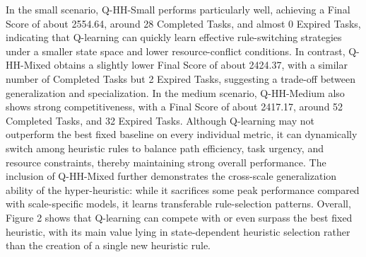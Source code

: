 In the small scenario, Q-HH-Small performs particularly well, achieving a Final Score of about 2554.64, around 28 Completed Tasks, and almost 0 Expired Tasks, indicating that Q-learning can quickly learn effective rule-switching strategies under a smaller state space and lower resource-conflict conditions. In contrast, Q-HH-Mixed obtains a slightly lower Final Score of about 2424.37, with a similar number of Completed Tasks but 2 Expired Tasks, suggesting a trade-off between generalization and specialization. In the medium scenario, Q-HH-Medium also shows strong competitiveness, with a Final Score of about 2417.17, around 52 Completed Tasks, and 32 Expired Tasks. Although Q-learning may not outperform the best fixed baseline on every individual metric, it can dynamically switch among heuristic rules to balance path efficiency, task urgency, and resource constraints, thereby maintaining strong overall performance. The inclusion of Q-HH-Mixed further demonstrates the cross-scale generalization ability of the hyper-heuristic: while it sacrifices some peak performance compared with scale-specific models, it learns transferable rule-selection patterns. Overall, Figure 2 shows that Q-learning can compete with or even surpass the best fixed heuristic, with its main value lying in state-dependent heuristic selection rather than the creation of a single new heuristic rule.
